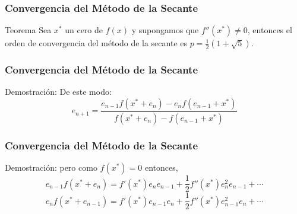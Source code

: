 \documentclass{beamer}
\begin{document}
\begin{frame}
  \frametitle{Convergencia del M\'etodo de la Secante}
  \begin{block}{Teorema}
    Sea $x^*$ un cero de $f(x)$ y supongamos que $f''(x^*) \neq 0$, entonces el orden de convergencia del m\'etodo de la secante es
$p=\frac{1}{2}(1+\sqrt{5})$.
  \end{block}
\end{frame}
\begin{frame}
  \frametitle{Convergencia del M\'etodo de la Secante}
  \begin{block}{Demostraci\'on:}
    De este modo:
    $$
    e_{n+1} = \frac{e_{n-1}f(x^*+e_n)-e_nf(e_{n-1}+x^*)}{f(x^*+e_n) - f(e_{n-1}+x^*)}
    $$
  \end{block}
\end{frame}  
\begin{frame}
  \frametitle{Convergencia del M\'etodo de la Secante}
  \begin{block}{Demostraci\'on:}
    pero como $f(x^*) = 0$ entonces,
    $$
    e_{n-1}f(x^*+e_n) = f'(x^*)e_ne_{n-1} + \frac{1}{2}f''(x^*)e_n^2e_{n-1} + \cdots
    $$    
    $$
    e_nf(x^*+e_{n-1}) = f'(x^*)e_{n-1}e_n + \frac{1}{2}f''(x^*)e_{n-1}^2e_n + \cdots
    $$
  \end{block}
\end{frame}
\end{document}
